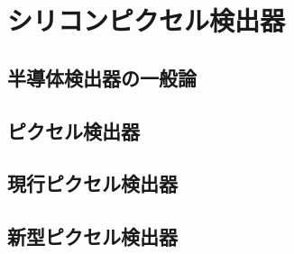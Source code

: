 \chapter{シリコンピクセル検出器}
\label{sec:}






\section{半導体検出器の一般論}
\label{sec:}








\section{ピクセル検出器}
\label{sec:}











\section{現行ピクセル検出器}
\label{sec:genkoupixel}






\section{新型ピクセル検出器}





\newpage
